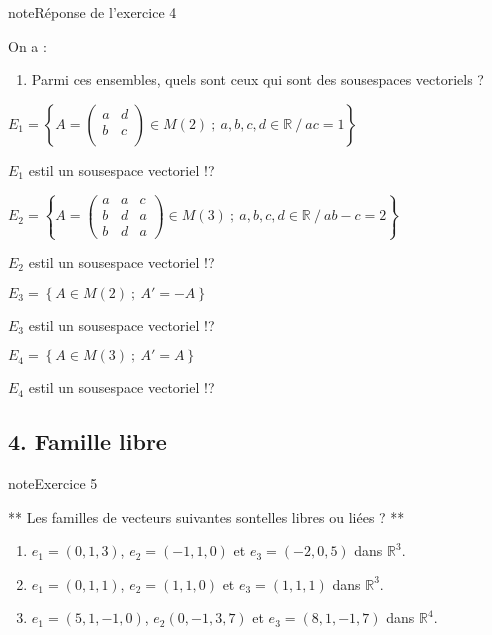 \documentclass[letterpaper,10pt,french]{jupyterBook}
\begin{document}
\begin{sphinxadmonition}{note}{Réponse de l’exercice 4}

\sphinxAtStartPar
On a :
\begin{enumerate}
%
\item {} 
\sphinxAtStartPar
Parmi ces ensembles, quels sont ceux qui sont des sous\sphinxhyphen{}espaces vectoriels ?

\end{enumerate}

\sphinxAtStartPar
\( 
E_1 = \left\{  A = \begin{pmatrix}
a& d\\
b&c \\
\end{pmatrix} \in M(2) ~;~ 
a,b,c, d \in \mathbb{R} ~/~ ac = 1\right\}
\)

\sphinxAtStartPar
\(E_1\) est\sphinxhyphen{}il un sous\sphinxhyphen{}espace vectoriel !?

\sphinxAtStartPar
\( 
E_2 = \left\{  A = \begin{pmatrix}
a& a & c\\
b& d & a\\
b& d & a
\end{pmatrix} \in M(3) ~;~
a,b,c, d \in \mathbb{R} ~/~ ab-c = 2\right\}
\)

\sphinxAtStartPar
\(E_2\) est\sphinxhyphen{}il un sous\sphinxhyphen{}espace vectoriel !?

\sphinxAtStartPar
\( 
E_3 = \left\{  A \in M(2) ~;~
A' = -A \right\}
\)

\sphinxAtStartPar
\(E_3\) est\sphinxhyphen{}il un sous\sphinxhyphen{}espace vectoriel !?

\sphinxAtStartPar
\( 
E_4 = \left\{  A \in M(3) ~;~
A' = A \right\}
\)

\sphinxAtStartPar
\(E_4\) est\sphinxhyphen{}il un sous\sphinxhyphen{}espace vectoriel !?
\end{sphinxadmonition}


\subsection{4. Famille libre}
\label{\detokenize{S_xe9rie1:famille-libre}}
\begin{sphinxadmonition}{note}{Exercice 5}

\sphinxAtStartPar
** Les familles de vecteurs suivantes sont\sphinxhyphen{}elles libres ou liées ? **
\begin{enumerate}
%
\item {} 
\sphinxAtStartPar
\(e_1=(0,1,3)\), \(e_2=(-1,1,0)\) et \(e_3=(-2,0,5)\) dans \(\mathbb{R}^3\).

\item {} 
\sphinxAtStartPar
\(e_1=(0,1,1)\), \(e_2=(1,1,0)\) et \(e_3=(1,1,1)\) dans \(\mathbb{R}^3\).

\item {} 
\sphinxAtStartPar
\(e_1=(5,1,-1,0)\), \(e_2(0,-1,3,7)\) et \(e_3=(8,1,-1,7)\) dans \(\mathbb{R}^4\).

\end{enumerate}
\end{sphinxadmonition}
\end{document}
